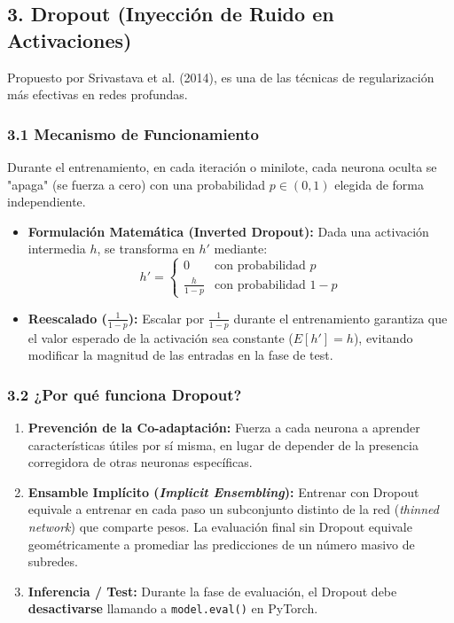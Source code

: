\subsection{3. Dropout (Inyección de Ruido en Activaciones)}

Propuesto por Srivastava et al. (2014), es una de las técnicas de regularización más efectivas en redes profundas.

\subsubsection{3.1 Mecanismo de Funcionamiento}

Durante el entrenamiento, en cada iteración o minilote, cada neurona oculta se "apaga" (se fuerza a cero) con una probabilidad $p \in (0, 1)$ elegida de forma independiente.

\begin{itemize}
	\item \textbf{Formulación Matemática (Inverted Dropout):}
	Dada una activación intermedia $h$, se transforma en $h'$ mediante:
	$$h' = \begin{cases} 0 & \text{con probabilidad } p \\ \frac{h}{1-p} & \text{con probabilidad } 1-p \end{cases}$$
	
	\item \textbf{Reescalado ($\frac{1}{1-p}$):} Escalar por $\frac{1}{1-p}$ durante el entrenamiento garantiza que el valor esperado de la activación sea constante ($E[h'] = h$), evitando modificar la magnitud de las entradas en la fase de test.
\end{itemize}

\subsubsection{3.2 ¿Por qué funciona Dropout?}

\begin{enumerate}
	\item \textbf{Prevención de la Co-adaptación:} Fuerza a cada neurona a aprender características útiles por sí misma, en lugar de depender de la presencia corregidora de otras neuronas específicas.
	\item \textbf{Ensamble Implícito (\emph{Implicit Ensembling}):} Entrenar con Dropout equivale a entrenar en cada paso un subconjunto distinto de la red (\emph{thinned network}) que comparte pesos. La evaluación final sin Dropout equivale geométricamente a promediar las predicciones de un número masivo de subredes.
	\item \textbf{Inferencia / Test:} Durante la fase de evaluación, el Dropout debe \textbf{desactivarse} llamando a \texttt{model.eval()} en PyTorch.
\end{enumerate}

